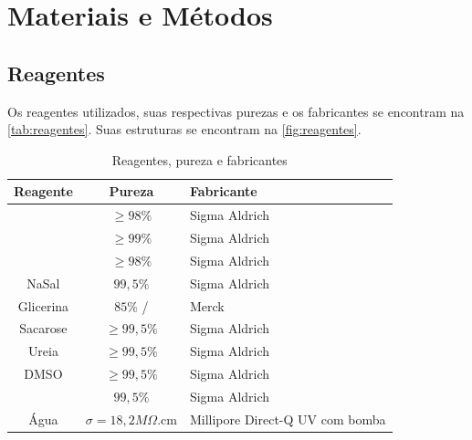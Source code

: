 \part{Materiais e Métodos}
	\chapter{Reagentes}
	
	Os reagentes utilizados, suas respectivas purezas e os fabricantes se encontram na \autoref{tab:reagentes}. Suas estruturas se encontram na \autoref{fig:reagentes}.
	
	\begin{table}[h]
		\IBGEtab%
		{\caption{Reagentes, pureza e fabricantes}
		\label{tab:reagentes}}%
	    {
		\centering
		\begin{tabular}{c c p{3.2cm}}
			\toprule
			Reagente  & Pureza                                          & Fabricante                                                  \\ \midrule
			  \CTAB    & \(\geqslant 98\%\)                              & Sigma Aldrich                                               \\
			  \TTAB    & \(\geqslant 99\%\)                              & Sigma Aldrich                                               \\
			  \DTAB    & \(\geqslant 98\%\)                              & Sigma Aldrich                                               \\
			  NaSal   & \(99{,}5\%\)                                    & Sigma Aldrich                                               \\
			Glicerina & \(85\%\) / \agua & Merck                                                       \\
			Sacarose  & \(\geqslant 99{,}5\%\)                          & Sigma Aldrich                                               \\
			  Ureia   & \(\geqslant 99{,}5\%\)                          & Sigma Aldrich                                               \\
			  DMSO    & \(\geqslant 99{,}5\%\)                          & Sigma Aldrich                                               \\
			  \BD   & \(99{,}5\%\)                                    & Sigma Aldrich                                               \\
			  Água    & \(\sigma = 18{,}2M\Omega\).cm                   & Millipore Direct-Q\textregistered{} \newline 3 UV com bomba \\ \bottomrule
		\end{tabular}}%
		{}
	\end{table}
	
